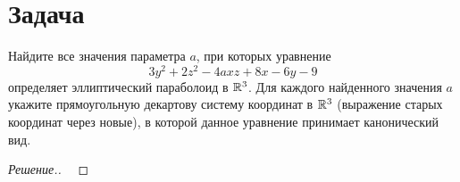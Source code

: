 \documentclass[a4paper]{article}
\theoremstyle{remark}
\begin{document}
    \section*{Задача }
        Найдите все значения параметра $a$, при которых уравнение 
        $$ 
        3y^2 + 2z^2 -4axz + 8x - 6y - 9
        $$
        определяет эллиптический параболоид в $\mathbb{R}^3$. Для каждого найденного значения  $a$
        укажите прямоугольную декартову систему координат в $\mathbb{R}^3$ (выражение старых координат 
        через новые), в которой данное уравнение принимает канонический вид. 
        \begin{proof}[Решение.] \ 
            

        \end{proof}
    
\end{document}
